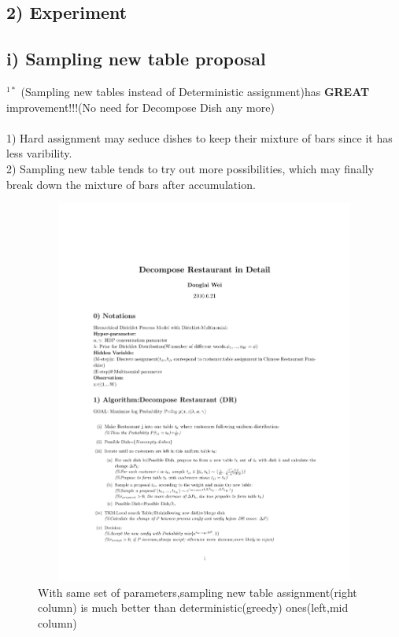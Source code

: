 \documentclass{article}
\begin{document}
\begin{spacing}{1.1}
\newpage
\section{2) Experiment}
\subsection{i) Sampling new table proposal}
$^{1*}$ (Sampling new tables instead of Deterministic assignment)has {\bf GREAT} improvement!!!(No need for Decompose Dish any more)\\ \\
1) Hard assignment may seduce dishes to keep their mixture of bars since it has less varibility.\\
2) Sampling new table tends to try out more possibilities, which may finally break down the mixture of bars after accumulation.\\

\begin{figure}
 \centering
    \includegraphics[width=6in,height=5in]{sample.pdf} 
    \caption{With same set of parameters,sampling new table assignment(right column) is much better than deterministic(greedy) ones(left,mid column)}
    \label{fig:by:table} 
\end{figure}



\newpage

\end{spacing}
\end{document}
